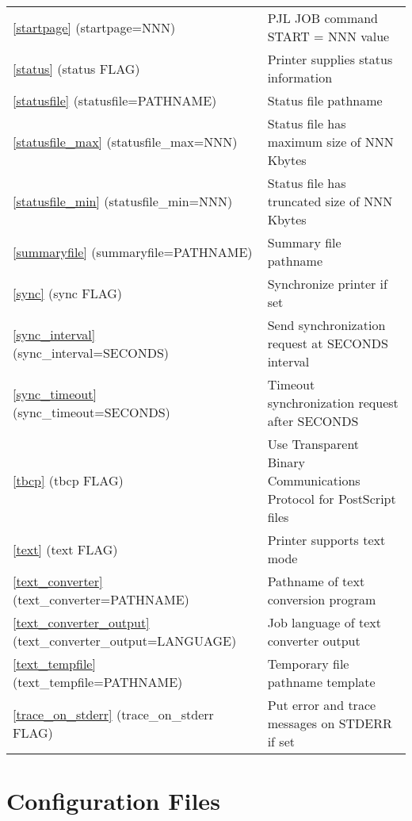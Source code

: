 \documentclass[a4paper]{article}
\begin{document}
\begin{table}[tbp]
\begin{center}
\begin{tabular}{ll}
{\ttfamily \ref{startpage} {(startpage=NNN)}}&  PJL JOB command START = NNN value\\ 
{\ttfamily \ref{status} {(status FLAG)}}&  Printer supplies status information\\ 
{\ttfamily \ref{statusfile} {(statusfile=PATHNAME)}}&  Status file pathname\\ 
{\ttfamily \ref{statusfile_max} {(statusfile\_max=NNN)}}&  Status file has maximum size of NNN Kbytes\\ 
{\ttfamily \ref{statusfile_min} {(statusfile\_min=NNN)}}&  Status file has truncated size of NNN Kbytes\\ 
{\ttfamily \ref{summaryfile} {(summaryfile=PATHNAME)}}&  Summary file pathname\\ 
{\ttfamily \ref{sync} {(sync FLAG)}}&  Synchronize printer if set\\ 
{\ttfamily \ref{sync_interval} {(sync\_interval=SECONDS)}}&  Send synchronization request at SECONDS interval\\ 
{\ttfamily \ref{sync_timeout} {(sync\_timeout=SECONDS)}}&  Timeout synchronization request after SECONDS\\ 
{\ttfamily \ref{tbcp} {(tbcp FLAG)}}&  Use Transparent Binary Communications Protocol for PostScript files\\ 
{\ttfamily \ref{text} {(text FLAG)}}&  Printer supports text mode\\ 
{\ttfamily \ref{text_converter} {(text\_converter=PATHNAME)}}&  Pathname of text conversion program\\ 
{\ttfamily \ref{text_converter_output} {(text\_converter\_output=LANGUAGE)}}&  Job language of text converter output\\ 
{\ttfamily \ref{text_tempfile} {(text\_tempfile=PATHNAME)}}&  Temporary file pathname template\\ 
{\ttfamily \ref{trace_on_stderr} {(trace\_on\_stderr FLAG)}}&  Put error and trace messages on STDERR if set\\ 
\end{tabular}
\end{center}
\end{table}



\section{Configuration Files
\label{configfiles}}
\end{document}
